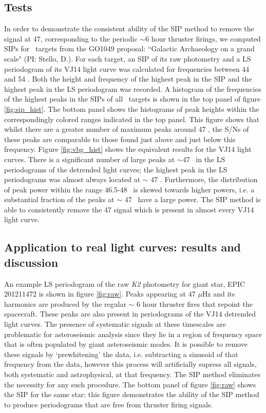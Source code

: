 \documentclass[useAMS, usenatbib, preprint, 12pt]{aastex}
\begin{document}
\subsection{Tests}

In order to demonstrate the consistent ability of the SIP method
to remove the signal at 47\uHz, corresponding to the periodic $\sim$6 hour
thruster firings, we computed SIPs for \nGO\ targets from the GO1049
proposal: ``Galactic Archaeology on a grand scale" (PI: Stello, D.).
For each target, an SIP of its raw photometry and a LS periodogram of its
VJ14 light curve was calculated for frequencies between
44 and 54 \uHz.
Both the height and frequency of the highest peak in the SIP and the highest
peak in the LS periodogram was recorded.
A histogram of the frequencies of the highest peaks in the SIPs of all \nGO\
targets is shown in the top panel of figure \ref{fig:sip_hist}.
The bottom panel shows the histograms of peak heights within the
correspondingly colored ranges indicated in the top panel.
This figure shows that whilst there are a greater number of maximum peaks
around 47 \uHz, the S/Ns of these peaks are comparable to those found just
above and just below this frequency.
Figure \ref{fig:vbg_hist} shows the equivalent results for the
VJ14 light curves.
There is a significant number of large peaks at $\sim$47 \uHz\ in the LS
periodograms of the detrended light curves; the highest peak in the LS
periodograms was almost always located at $\sim$ 47 \uHz.
Furthermore, the distribution of peak power within the range 46.5-48 \uHz\ is
skewed towards higher powers, i.e. a substantial fraction of the peaks at
$\sim$ 47 \uHz\ have a large power.
The SIP method is able to consistently remove the 47 \uHz signal which is
present in almost every VJ14 light curve.

\subsection{Application to real light curves: results and discussion}
\label{section:rotation}

An example LS periodogram of the raw {\it K2} photometry
for giant star, EPIC 201211472 is shown in figure \ref{fig:raw}.
Peaks appearing at 47 $\mu$Hz and its harmonics are produced by the regular
$\sim$ 6 hour thruster fires that repoint the spacecraft.
These peaks are also present in periodograms of the VJ14 detrended light
curves.
The presence of systematic signals at these timescales are problematic for
asteroseismic analysis since they lie in a region of frequency space
that is often populated by giant asteroseismic modes.
It is possible to remove these signals by `prewhitening' the data, i.e.
subtracting a sinusoid of that frequency from the data, however this process
will artificially supress all signals, both systematic and astrophysical, at
that frequency.
The SIP method eliminates the necessity for any such procedure.
The bottom panel of figure \ref{fig:raw} shows the SIP for the same star; this
figure demonstrates the ability of the SIP method to produce periodograms that
are free from thruster firing signals.
\end{document}
